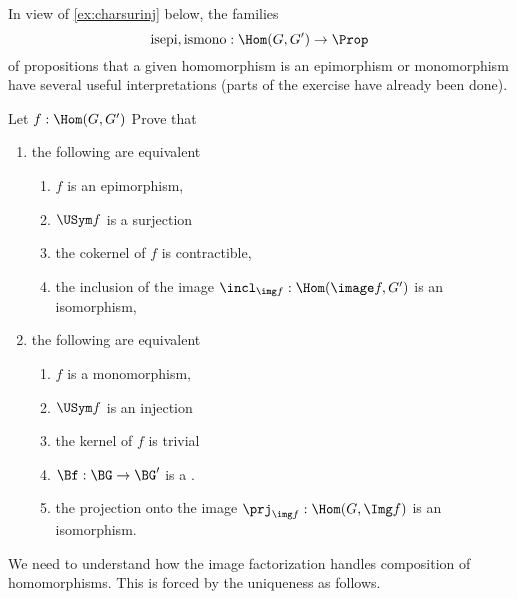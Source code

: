In view of \cref{ex:charsurinj} below, the families
$$\mathrm{isepi},\mathrm{ismono}:\Hom(G,G')\to\Prop
$$
of propositions that a given homomorphism is an epimorphism or monomorphism have several useful interpretations (parts of the exercise have already been done).
\begin{xca}
  \label{ex:charsurinj}
  Let $f:\Hom(G,G')$ Prove that
  \begin{enumerate}
  \item the following are equivalent
    \begin{enumerate}
    \item $f$ is an epimorphism,
    \item $\USym f$ is a surjection
    \item the cokernel of $f$ is contractible,
    \item the inclusion of the image $\incl_{\img f}:\Hom(\image f,G')$ is an isomorphism,
    \end{enumerate}
  \item the following are equivalent
    \begin{enumerate}
    \item $f$ is a monomorphism,
    \item $\USym f$ is an injection
\item the kernel of $f$ is trivial
\item $\Bf:\BG\to \BG'$ is a \covering.
\item the projection onto the image $\prj_{\img f}:\Hom(G,\Img f)$ is an isomorphism.
    \end{enumerate}
  \end{enumerate}
\end{xca}

We need to understand how the image factorization handles composition of homomorphisms.
This is forced by the uniqueness as follows.

